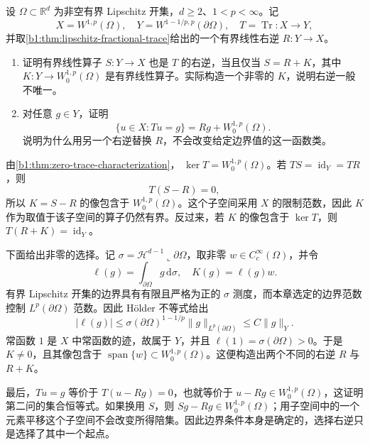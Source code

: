 \begin{exercise}\label{b1:ex:23-trace-right-inverse-freedom}
设 \(\Omega\subset\mathbb R^d\) 为非空有界 Lipschitz 开集，\(d\ge2\)、\(1<p<\infty\)。记
\[
 X=W^{1,p}(\Omega),\quad
 Y=W^{1-1/p,p}(\partial\Omega),\quad
 T=\operatorname{Tr}:X\longrightarrow Y,
\]
并取\cref{b1:thm:lipschitz-fractional-trace}给出的一个有界线性右逆 \(R:Y\to X\)。
\begin{enumerate}
 \item\label{b1:item:23-trace-right-inverse-difference}
 证明有界线性算子 \(S:Y\to X\) 也是 \(T\) 的右逆，当且仅当
 \(S=R+K\)，其中 \(K:Y\to W_0^{1,p}(\Omega)\) 是有界线性算子。实际构造一个非零的 \(K\)，说明右逆一般不唯一。
 \item\label{b1:item:23-trace-affine-class}
 对任意 \(g\in Y\)，证明
 \[
  \{u\in X:Tu=g\}=Rg+W_0^{1,p}(\Omega).
 \]
 说明为什么用另一个右逆替换 \(R\)，不会改变给定边界值的这一函数类。
\end{enumerate}
\end{exercise}
\begin{solution}
由\cref{b1:thm:zero-trace-characterization}，
\(\ker T=W_0^{1,p}(\Omega)\)。若 \(TS=\operatorname{id}_Y=TR\)，则
\[
 T(S-R)=0,
\]
所以 \(K=S-R\) 的像包含于 \(W_0^{1,p}(\Omega)\)。这个子空间采用 \(X\) 的限制范数，因此 \(K\) 作为取值于该子空间的算子仍然有界。反过来，若 \(K\) 的像包含于 \(\ker T\)，则 \(T(R+K)=\operatorname{id}_Y\)。

下面给出非零的选择。记 \(\sigma=\mathcal H^{d-1}\llcorner\partial\Omega\)，取非零 \(w\in C_c^\infty(\Omega)\)，并令
\[
 \ell(g)=\int_{\partial\Omega}g\,\mathrm d\sigma,
 \quad K(g)=\ell(g)w.
\]
有界 Lipschitz 开集的边界具有有限且严格为正的 \(\sigma\) 测度，而本章选定的边界范数控制 \(L^p(\partial\Omega)\) 范数。因此 Hölder 不等式给出
\[
 |\ell(g)|\le
 \sigma(\partial\Omega)^{1-1/p}\|g\|_{L^p(\partial\Omega)}
 \le C\|g\|_Y.
\]
常函数 \(1\) 是 \(X\) 中常函数的迹，故属于 \(Y\)，并且
\(\ell(1)=\sigma(\partial\Omega)>0\)。于是 \(K\ne0\)，且其像包含于
\(\operatorname{span}\{w\}\subset W_0^{1,p}(\Omega)\)。这便构造出两个不同的右逆 \(R\) 与 \(R+K\)。

最后，\(Tu=g\) 等价于 \(T(u-Rg)=0\)，也就等价于
\(u-Rg\in W_0^{1,p}(\Omega)\)，这证明第二问的集合恒等式。如果换用 \(S\)，则
\(Sg-Rg\in W_0^{1,p}(\Omega)\)；用子空间中的一个元素平移这个子空间不会改变所得陪集。因此边界条件本身是确定的，选择右逆只是选择了其中一个起点。
\end{solution}


